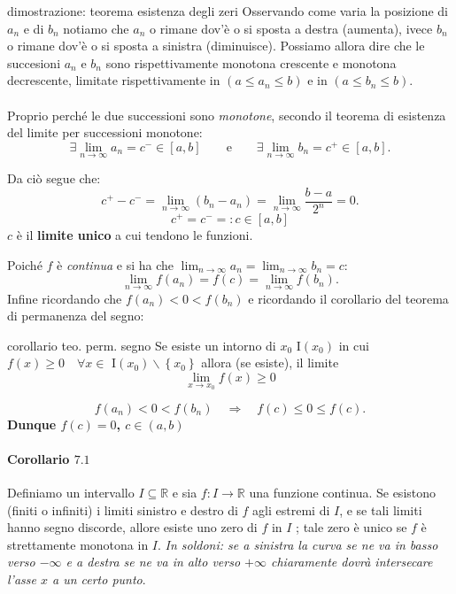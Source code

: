 \documentclass[x11names]{article}
\begin{document}
\begin{es}{dimostrazione: teorema esistenza degli zeri}
		Osservando come varia la posizione di $a_{n}$ e di $b_{n}$ notiamo che $a_{n}$ o rimane dov'è o si sposta a destra (aumenta), ivece $b_{n}$ o rimane dov'è o si sposta a sinistra (diminuisce). Possiamo allora dire che le succesioni ${a_{n}}$ e ${b_{n}}$ sono rispettivamente monotona crescente e monotona decrescente, limitate rispettivamente in $\left(a \leq a_{n} \leq b\right)$ e in $\left(a \leq b_{n} \leq b\right)$.
		\\ \\
		Proprio perché le due successioni sono \textit{monotone}, secondo il teorema di esistenza del limite per successioni monotone:
		\[
		\exists \lim_{n\to \infty}a_{n} = c^- \in \left[a,b\right] \qquad \text{e} \qquad \exists\lim_{n\to \infty}b_{n} =c^+ \in \left[a,b\right]
		.\] 
		
	\end{es}
	\begin{es}{}
		
		
		Da ciò segue che:
		\[
		c^+ - c^- = \lim_{n\to \infty}\left(b_{n} - a_{n}\right) = \lim_{n\to \infty}\frac{b-a}{2^n} = 0
		.\] 
		\[
		c^+ = c^- =: c \in \left[a,b\right]
		\]
		$c$ è il \textbf{limite unico} a cui tendono le funzioni.
		 
		Poiché $f$ è \textit{continua} e si ha che $\lim_{n\to \infty}a_{n} = \lim_{n\to \infty}b_{n} = c$:
		\[
		\lim_{n\to \infty}f\left(a_{n}\right)  = f\left(c\right) = \lim_{n\to \infty}f\left(b_{n}\right)
		.\] 
		Infine ricordando che $f\left(a_{n}\right) < 0 < f\left(b_{n}\right)$ e ricordando il corollario del teorema di permanenza del segno:
		\begin{es}{corollario teo. perm. segno}
			Se esiste un intorno di $x_0$ I$(x_0)$ in cui $f(x) \geq 0 \quad \forall x \in$ I$(x_0) \backslash \left\{x_0\right\}$ allora (se esiste), il limite
			\[
			\lim_{x \to x_0}f(x) \geq 0
			\]
		\end{es}
		\[
		f\left(a_{n}\right) < 0 < f\left(b_{n}\right) \quad \Rightarrow \quad f\left(c\right) \leq 0 \leq f\left(c\right)
		.\] 
		\textbf{Dunque $f\left(c\right) = 0$, $c \in \left(a,b\right)$ } 
	\end{es}
	
	\paragraph{Corollario $7.1$}
	Definiamo un intervallo $I \subseteq \mathbb{R}$ e sia $f:I \rightarrow \mathbb{R}$ una funzione continua. Se esistono (finiti o infiniti) i limiti sinistro e destro di $f$ agli estremi di $I$, e se tali limiti hanno segno discorde, allore esiste uno zero di $f$ in $I$ ; tale zero è unico se $f$ è strettamente monotona in $I$.
	\textit{In soldoni: se a sinistra la curva se ne va in basso verso $-\infty$ e a destra se ne va in alto verso $+\infty$ chiaramente dovrà intersecare l'asse $x$ a un certo punto}.
	
\end{document}
